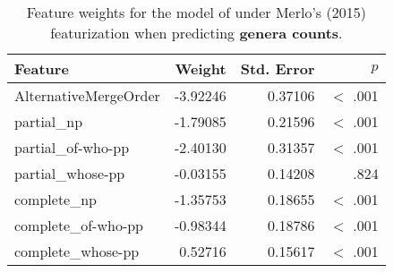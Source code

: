 \documentclass[11pt]{article}
\newcommand{\lt}{<}
\begin{document}
\begin{table}[ht!]
  \centering
  \begin{tabular}{|l|r|r|r|}
    \hline
    Feature & Weight & Std. Error & $p$ \\
    \hline
    AlternativeMergeOrder & -3.92246 &    0.37106 & $\lt$ .001 \\
    partial\_np                      & -1.79085 &    0.21596 & $\lt$ .001 \\
    partial\_of-who-pp               & -2.40130 &    0.31357 & $\lt$ .001 \\
    partial\_whose-pp                & -0.03155 &    0.14208 & .824 \\
    complete\_np                     & -1.35753 &    0.18655 & $\lt$ .001 \\
    complete\_of-who-pp              & -0.98344 &    0.18786 & $\lt$ .001 \\
    complete\_whose-pp                & 0.52716 &    0.15617 & $\lt$ .001 \\
    \hline
  \end{tabular}
  \caption{Feature weights for the model of \citet{cinque2005deriving} under Merlo's (2015) featurization when predicting \textbf{genera counts}.}
\end{table}
\end{document}
